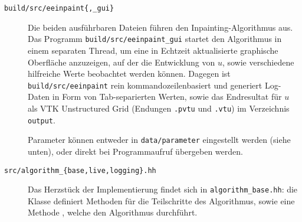 \documentclass{mythesis}
\begin{document}
\begin{description}
    \item[\texttt{build/src/eeinpaint\{,_gui\}}]
	Die beiden ausführbaren Dateien führen den Inpainting-Algorithmus aus.
 	Das Programm \texttt{build/src/eeinpaint_gui} startet den Algorithmus in einem separaten Thread, um eine in Echtzeit aktualisierte graphische Oberfläche anzuzeigen, auf der die Entwicklung von $u$, sowie verschiedene hilfreiche Werte beobachtet werden können.
	Dagegen ist \texttt{build/src/eeinpaint} rein kommandozeilenbasiert und generiert Log-Daten in Form von Tab-separierten Werten, sowie das Endresultat für $u$ als VTK Unstructured Grid (Endungen \texttt{.pvtu} und \texttt{.vtu}) im Verzeichnis \texttt{output}.

	Parameter können entweder in \texttt{data/parameter} eingestellt werden (siehe unten), oder direkt bei Programmaufruf übergeben werden.
    \item[\texttt{src/algorithm_\{base,live,logging\}.hh}]
	Das Herzstück der Implementierung findet sich in \texttt{algorithm_base.hh}: die Klasse  definiert Methoden für die Teilschritte des Algorithmus, sowie eine Methode , welche den Algorithmus durchführt.


\end{description}
\end{document}
